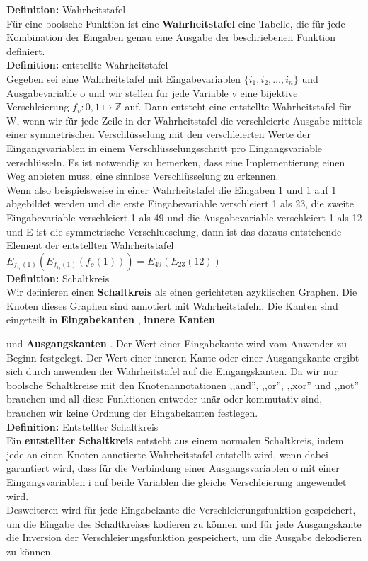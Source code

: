 \documentclass{article}
\newenvironment{definition}
    [1]
    {
        {\bf Definition:} #1\\
    }
    {}
\newcommand{\defined}
    [1]
    {
        {\bf #1}
    }
\begin{document}
\begin{definition}{Wahrheitstafel}
F\"ur eine boolsche Funktion ist eine \defined{Wahrheitstafel} eine Tabelle,
die f\"ur jede Kombination der Eingaben genau eine Ausgabe der beschriebenen
Funktion definiert.
\end{definition}\\
\begin{definition}{entstellte Wahrheitstafel}
Gegeben sei eine Wahrheitstafel mit Eingabevariablen 
\(\{i_1, i_2, \dots, i_n\}\) und Ausgabevariable o und wir 
 stellen f\"ur jede Variable v eine bijektive
 Verschleierung \(f_v : {0, 1} \mapsto \mathbb{Z}\) auf. 
Dann entsteht eine entstellte Wahrheitstafel f\"ur W, wenn
 wir f\"ur jede Zeile in der Wahrheitstafel die verschleierte Ausgabe
 mittels einer symmetrischen Verschl\"usselung mit den 
 verschleierten Werte der Eingangsvariablen in einem 
 Verschl\"usselungsschritt pro Eingangsvariable verschl\"usseln.
Es ist notwendig zu bemerken, dass eine Implementierung
 einen Weg anbieten muss, eine sinnlose Verschl\"usselung
 zu erkennen.\\
Wenn also beispielsweise in einer Wahrheitstafel die Eingaben 
 1 und 1 auf 1 abgebildet werden und die erste Eingabevariable
 verschleiert 1 als 23, die zweite Eingabevariable verschleiert
 1 als 49 und die Ausgabevariable verschleiert 1 als 12 und E
 ist die symmetrische Verschlueselung, dann
 ist das daraus entstehende Element der entstellten Wahrheitstafel
 \(E_{f_{i_1}(1)}(E_{f_{i_2}(1)}(f_o(1))) = E_{49}(E_{23}(12))\)
\end{definition}\\
\begin{definition}{Schaltkreis}
Wir definieren einen \defined{Schaltkreis} als einen gerichteten azyklischen 
 Graphen.
Die Knoten dieses Graphen sind annotiert mit Wahrheitstafeln. 
Die Kanten sind eingeteilt in \defined{Eingabekanten}, \defined{innere Kanten} 
 und \defined{Ausgangskanten}.
Der Wert einer Eingabekante wird vom Anwender zu Beginn festgelegt. 
Der Wert einer inneren Kante oder einer Ausgangskante ergibt sich durch
 anwenden der Wahrheitstafel auf die Eingangskanten. 
Da wir nur boolsche Schaltkreise mit den Knotenannotationen ,,and'',
 ,,or'', ,,xor'' und ,,not'' brauchen und all diese Funktionen entweder
 un\"ar oder kommutativ sind, brauchen wir keine Ordnung der Eingabekanten
 festlegen.
\end{definition}\\
\begin{definition}{Entstellter Schaltkreis}
Ein \defined{entstellter Schaltkreis} entsteht aus einem normalen Schaltkreis,
 indem jede an einen Knoten annotierte Wahrheitstafel entstellt wird, wenn
 dabei garantiert wird, dass f\"ur die Verbindung einer Ausgangsvariablen
 o mit einer Eingangsvariablen i auf beide Variablen die gleiche
 Verschleierung angewendet wird.\\
Desweiteren wird f\"ur jede Eingabekante die Verschleierungsfunktion
 gespeichert, um die Eingabe des Schaltkreises kodieren zu k\"onnen und
 f\"ur jede Ausgangskante die Inversion der Verschleierungsfunktion
 gespeichert, um die Ausgabe dekodieren zu k\"onnen.
\end{definition}
\end{document}
